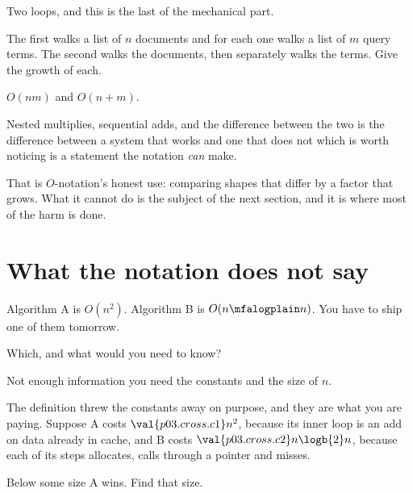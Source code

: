 \begin{fr}
Two loops, and this is the last of the mechanical part.

The first walks a list of $n$ documents and for each one walks a list of $m$
query terms. The second walks the documents, then separately walks the terms.
Give the growth of each.
\nextframe
\end{fr}

\begin{fr}
\begin{ansblock}
$O(nm)$ and $O(n + m)$.
\end{ansblock}

Nested multiplies, sequential adds, and the difference between the two is the
difference between a system that works and one that does not \dash{} which is
worth noticing is a statement the notation \emph{can} make.

That is $O$-notation's honest use: comparing shapes that differ by a factor
that grows. What it cannot do is the subject of the next section, and it is
where most of the harm is done.
\end{fr}

\section{What the notation does not say}
\label{sec:P03-not}

\begin{fr}
Algorithm A is $O(n^{2})$. Algorithm B is $O(n \mfalogplain n)$. You have to ship one
of them tomorrow.

Which, and what would you need to know?
\nextframe
\end{fr}

\begin{fr}
\begin{ansblock}
Not enough information \dash{} you need the constants and the size of $n$.
\end{ansblock}

The definition threw the constants away on purpose, and they are what you are
paying. Suppose A costs $\val{p03.cross.c1} n^{2}$, because its inner loop is
an add on data already in cache, and B costs $\val{p03.cross.c2} n\logb{2} n$,
because each of its steps allocates, calls through a pointer and misses.

Below some size A wins. Find that size.
\nextframe
\end{fr}


